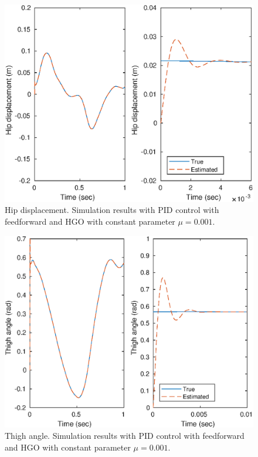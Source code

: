 \documentclass[letterpaper, 10 pt, conference]{ieeeconf}  %
\theoremstyle{plain}
\theoremstyle{definition}
\theoremstyle{remark}
\begin{document}
\begin{figure}[h!]
\begin{center}
\includegraphics[width = 13cm]{Figs/q_hip_mu_1e-03.eps}
\caption{Hip displacement. Simulation results with PID control with feedforward and HGO with constant parameter $\mu=0.001$.}
\label{fig:hip}
\end{center}
\end{figure}
%
%
\begin{figure}[h!]
\begin{center}
\includegraphics[width = 13cm]{Figs/q_thigh_mu_1e-03.eps}
\caption{Thigh angle. Simulation results with PID control with feedforward and HGO with constant parameter $\mu=0.001$.}
\label{fig:thigh}
\end{center}
\end{figure}
\end{document}
